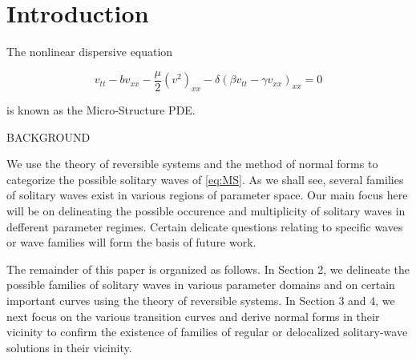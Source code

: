 \section{Introduction}

The nonlinear dispersive equation \cite{Roy1}
 

\begin{equation}\label{eq:MS}
v_{tt} - b v_{xx} - \frac{\mu}{2} \left( v^2 \right)_{xx} - \delta \left( \beta v_{tt} - \gamma v_{xx}\right)_{xx} = 0 
\end{equation}

is known as the Micro-Structure PDE. 

BACKGROUND

We use the theory of reversible systems and the method of normal forms to categorize the possible solitary waves of \eqref{eq:MS}.
As we shall see, several families of solitary waves exist in various regions of parameter space. Our main focus here will be on 
delineating the possible occurence and multiplicity of solitary waves in defferent parameter regimes. Certain delicate questions
relating to specific waves or wave families will form the basis of future work. 

The remainder of this paper is organized as follows. In Section 2, we delineate the possible families of solitary waves
in various parameter domains and on certain important curves using the theory of reversible systems. In Section 3 and 4, we next
focus on the various transition curves and derive normal forms in their vicinity to confirm the existence of families of 
regular or delocalized solitary-wave solutions in their vicinity.
